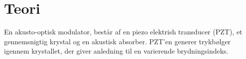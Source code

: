 \documentclass[main]{subfiles}
\begin{document}
\section{Teori}
En akusto-optisk modulator, består af en piezo elektrish transducer (PZT), et gennemsnigtig krystal og en akustisk absorber. PZT'en generer trykbølger igennem krystallet, der giver anledning til en varierende brydningsindeks.
\end{document}
